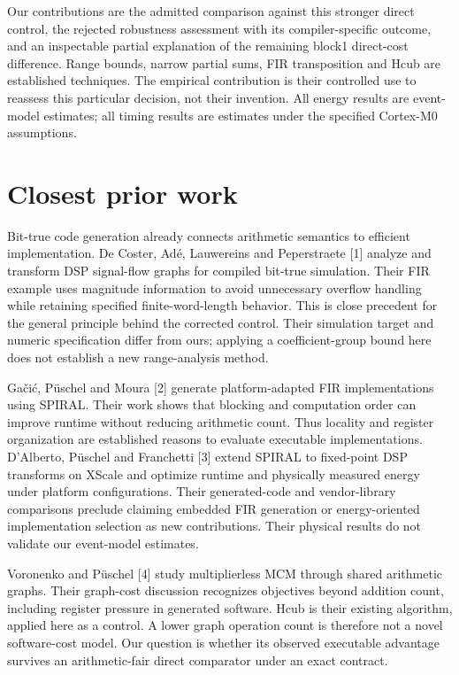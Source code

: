 \documentclass[conference]{IEEEtran}
\begin{document}
Our contributions are the admitted comparison against this stronger
direct control, the rejected robustness assessment with its
compiler-specific outcome, and an inspectable partial explanation of the
remaining block1 direct-cost difference. Range bounds, narrow partial
sums, FIR transposition and Hcub are established techniques. The
empirical contribution is their controlled use to reassess this
particular decision, not their invention. All energy results are
event-model estimates; all timing results are estimates under the
specified Cortex-M0 assumptions.

\section{Closest prior work}\label{closest-prior-work}

Bit-true code generation already connects arithmetic semantics to
efficient implementation. De Coster, Adé, Lauwereins and Peperstraete
{[}1{]} analyze and transform DSP signal-flow graphs for compiled
bit-true simulation. Their FIR example uses magnitude information to
avoid unnecessary overflow handling while retaining specified
finite-word-length behavior. This is close precedent for the general
principle behind the corrected control. Their simulation target and
numeric specification differ from ours; applying a coefficient-group
bound here does not establish a new range-analysis method.

Gačić, Püschel and Moura {[}2{]} generate platform-adapted FIR
implementations using SPIRAL. Their work shows that blocking and
computation order can improve runtime without reducing arithmetic count.
Thus locality and register organization are established reasons to
evaluate executable implementations. D'Alberto, Püschel and Franchetti
{[}3{]} extend SPIRAL to fixed-point DSP transforms on XScale and
optimize runtime and physically measured energy under platform
configurations. Their generated-code and vendor-library comparisons
preclude claiming embedded FIR generation or energy-oriented
implementation selection as new contributions. Their physical results do
not validate our event-model estimates.

Voronenko and Püschel {[}4{]} study multiplierless MCM through shared
arithmetic graphs. Their graph-cost discussion recognizes objectives
beyond addition count, including register pressure in generated
software. Hcub is their existing algorithm, applied here as a control. A
lower graph operation count is therefore not a novel software-cost
model. Our question is whether its observed executable advantage
survives an arithmetic-fair direct comparator under an exact contract.
\end{document}
